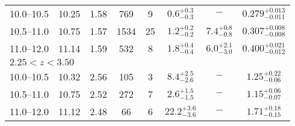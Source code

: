 \begin{table*}
\begin{tabular}{lc|c|c c|c c c}
\hline                  
10.0--10.5          & 10.25    & 1.58   & 769   & 9     & $0.6^{+0.3}_{-0.3}$           & $- $                                            & $0.279^{+0.013}_{-0.011}$     \T \B \\   
10.5--11.0              & 10.75    & 1.57       & 1534  & 25    & $1.2^{+0.2}_{-0.2}$           & $7.4^{+0.8}_{-0.8}$             & $0.307^{+0.008}_{-0.008}$     \T \B \\   
11.0--12.0          & 11.14    & 1.59   & 532   & 8     & $1.8^{+0.4}_{-0.4}$           & $6.0^{+2.1}_{-3.0}$             & $0.400^{+0.021}_{-0.012}$     \T \B \\   
\hline
\hline
\multicolumn{8}{l}{$2.25<z<3.50$}        \\
\hline
10.0--10.5          & 10.32        & 2.56       & 105   & 3         & $ 8.4^{+2.5}_{-2.6}$          & $- $                                               & $1.25^{+0.22}_{-0.06}$        \T \B \\  
10.5--11.0              & 10.75    & 2.52       & 272   & 7     & $ 2.6^{+1.5}_{-1.5}$      & $- $                                             & $1.15^{+0.06}_{-0.07}$        \T \B \\  
11.0--12.0          & 11.12        & 2.48       & 66    & 6         & $22.2^{+3.6}_{-3.6}$      & $-$                                              & $1.71^{+0.18}_{-0.15}$        \T \B \\  
\hline
\end{tabular}%
\end{table*}
